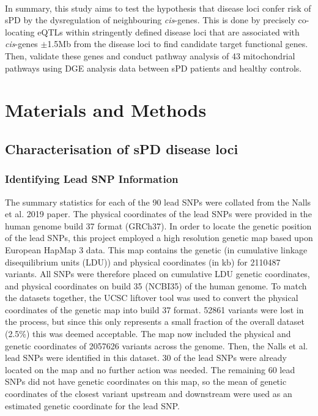 \documentclass{article}
\begin{document}
\\In summary, this study aims to test the hypothesis that disease loci confer risk of sPD by the dysregulation of neighbouring \textit{cis}-genes. This is done by precisely co-locating eQTLs within stringently defined disease loci that are associated with \textit{cis}-genes $\pm$1.5Mb from the disease loci to find candidate target functional genes. Then, validate these genes and conduct pathway analysis of 43 mitochondrial pathways using DGE analysis data between sPD patients and healthy controls.
\newpage
\section{Materials and Methods}
\subsection{Characterisation of sPD disease loci}
\subsubsection{Identifying Lead SNP Information}
\label{subsubsec:SNPs}
The summary statistics for each of the 90 lead SNPs were collated from the Nalls et al. 2019 paper\cite{Nalls2019IdentificationStudies}. The physical coordinates of the lead SNPs were provided in the human genome build 37 format (GRCh37). In order to locate the genetic position of the lead SNPs, this project employed a high resolution genetic map\cite{Maniatis2004PositionalDisequilibrium.} based upon European HapMap 3 data. This map contains the genetic (in cumulative linkage disequilibrium units (LDU)) and physical coordinates (in kb) for 2110487 variants. All SNPs were therefore placed on cumulative LDU genetic coordinates, and physical coordinates on build 35 (NCBI35) of the human genome. To match the datasets together, the UCSC liftover tool\cite{Hinrichs2006The2006.} was used to convert the physical coordinates of the genetic map into build 37 format. 52861 variants were lost in the process, but since this only represents a small fraction of the overall dataset (2.5\%) this was deemed acceptable. The map now included the physical and genetic coordinates of 2057626 variants across the genome. Then, the Nalls et al.\cite{Nalls2019IdentificationStudies} lead SNPs were identified in this dataset. 30 of the lead SNPs were already located on the map and no further action was needed. The remaining 60 lead SNPs did not have genetic coordinates on this map, so the mean of genetic coordinates of the closest variant upstream and downstream were used as an estimated genetic coordinate for the lead SNP.
\end{document}
